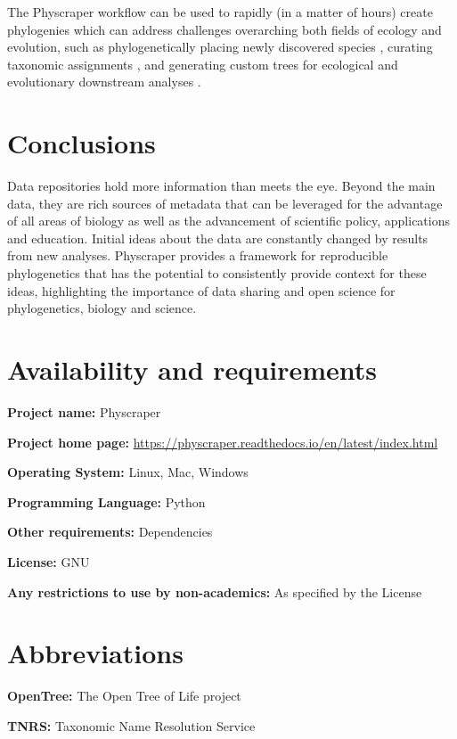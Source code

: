 \documentclass{bmcart}
\begin{document}
The Physcraper workflow can be used to rapidly (in a matter of hours) create
phylogenies which can address challenges overarching both fields of ecology and evolution, such as
phylogenetically placing newly discovered species \cite{webb2010biodiversity},
curating taxonomic assignments
\cite{san2010molecular},
and generating custom trees for ecological \cite{helmus2012phylogenetic} and
evolutionary downstream analyses \cite{stoltzfus2013phylotastic}.

\section*{Conclusions}
Data repositories hold more information than meets the eye.
Beyond the main data, they are rich sources of metadata that can be leveraged
for the advantage of all areas of biology as well as the advancement of scientific
policy, applications and education.
Initial ideas about the data are constantly changed by results from new analyses.
Physcraper provides a framework for reproducible phylogenetics that has the
potential to consistently provide context for these ideas, highlighting the
importance of data sharing and open science for phylogenetics, biology and science.

\section*{Availability and requirements}

\textbf{Project name:} Physcraper

\textbf{Project home page:} \href{https://physcraper.readthedocs.io/en/latest/index.html}{https://physcraper.readthedocs.io/en/latest/index.html}

\textbf{Operating System:} Linux, Mac, Windows

\textbf{Programming Language:} Python

\textbf{Other requirements:} Dependencies

\textbf{License:} GNU

\textbf{Any restrictions to use by non-academics:} As specified by the License

\section*{Abbreviations}

\textbf{OpenTree:} The Open Tree of Life project

\textbf{TNRS:} Taxonomic Name Resolution Service
\end{document}
